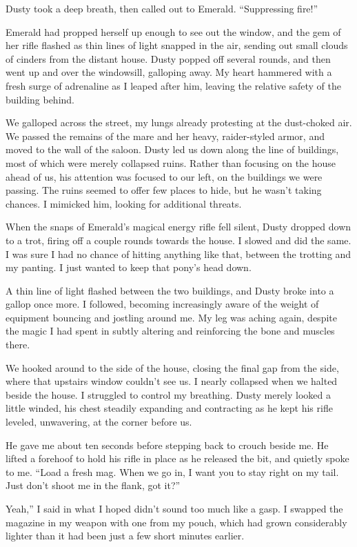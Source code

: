 Dusty took a deep breath, then called out to Emerald. “Suppressing fire!”

Emerald had propped herself up enough to see out the window, and the gem of her rifle flashed as thin lines of light snapped in the air, sending out small clouds of cinders from the distant house. Dusty popped off several rounds, and then went up and over the windowsill, galloping away. My heart hammered with a fresh surge of adrenaline as I leaped after him, leaving the relative safety of the building behind.

We galloped across the street, my lungs already protesting at the dust-choked air. We passed the remains of the mare and her heavy, raider-styled armor, and moved to the wall of the saloon. Dusty led us down along the line of buildings, most of which were merely collapsed ruins. Rather than focusing on the house ahead of us, his attention was focused to our left, on the buildings we were passing. The ruins seemed to offer few places to hide, but he wasn’t taking chances. I mimicked him, looking for additional threats.

When the snaps of Emerald’s magical energy rifle fell silent, Dusty dropped down to a trot, firing off a couple rounds towards the house. I slowed and did the same. I was sure I had no chance of hitting anything like that, between the trotting and my panting. I just wanted to keep that pony’s head down.

A thin line of light flashed between the two buildings, and Dusty broke into a gallop once more. I followed, becoming increasingly aware of the weight of equipment bouncing and jostling around me. My leg was aching again, despite the magic I had spent in subtly altering and reinforcing the bone and muscles there.

We hooked around to the side of the house, closing the final gap from the side, where that upstairs window couldn’t see us. I nearly collapsed when we halted beside the house. I struggled to control my breathing. Dusty merely looked a little winded, his chest steadily expanding and contracting as he kept his rifle leveled, unwavering, at the corner before us.

He gave me about ten seconds before stepping back to crouch beside me. He lifted a forehoof to hold his rifle in place as he released the bit, and quietly spoke to me. “Load a fresh mag. When we go in, I want you to stay right on my tail. Just don’t shoot me in the flank, got it?”

\leavevmode{}Yeah,” I said in what I hoped didn’t sound too much like a gasp. I swapped the magazine in my weapon with one from my pouch, which had grown considerably lighter than it had been just a few short minutes earlier.

